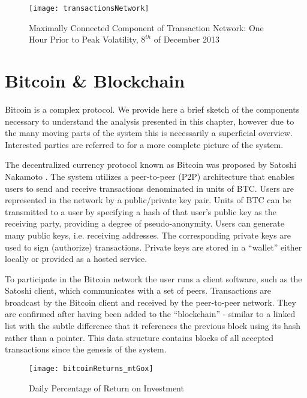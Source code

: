 \begin{figure}
  \centering
    \texttt{[image: transactionsNetwork]}
  \caption{Maximally Connected Component of Transaction Network: One Hour Prior to Peak Volatility, $8^{th}$ of December 2013}
\end{figure}

\section{Bitcoin \& Blockchain}

Bitcoin is a complex protocol. 
We provide here a brief sketch of the components necessary to understand the analysis presented in this chapter, however due to the many moving parts of the system this is necessarily a superficial overview. 
Interested parties are referred to \cite{narayanan2016bitcoin} for a more complete picture of the system. 

The decentralized currency protocol known as Bitcoin was proposed by Satoshi Nakamoto \cite{nakamoto2008bitcoin}. 
The system utilizes a peer-to-peer (P2P) architecture that enables users to send and receive transactions denominated in units of BTC. 
Users are represented in the network by a public/private key pair. 
Units of BTC can be transmitted to a user by specifying a hash of that user's public key as the receiving party, providing a degree of pseudo-anonymity.  
Users can generate many public keys, i.e. receiving addresses. 
The corresponding private keys are used to sign (authorize) transactions. 
Private keys are stored in a ``wallet'' either locally or provided as a hosted service. 

To participate in the Bitcoin network the user runs a client software, such as the Satoshi client, which communicates with a set of peers. 
Transactions are broadcast by the Bitcoin client and received by the peer-to-peer network.
They are confirmed after having been added to the ``blockchain'' - similar to a linked list with the subtle difference that it references the previous block using its hash rather than a pointer. 
This data structure contains blocks of all accepted transactions since the genesis of the system. 

\begin{figure}
\centering
        \texttt{[image: bitcoinReturns\_mtGox]}
        \caption{Daily Percentage of Return on Investment}
        \label{fig:RQS}
\end{figure}



